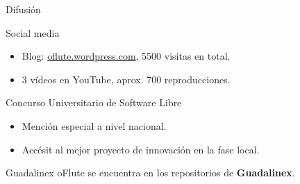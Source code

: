 \begin{frame}{Difusión}
  \begin{block}{Social media}
    \begin{itemize}
    \item Blog: \url{oflute.wordpress.com}, 5500 visitas en total.
    \item 3 vídeos en YouTube, aprox. 700 reproducciones.
    \end{itemize}    
  \end{block}

  \pause

  \begin{block}{Concurso Universitario de Software Libre}
    \begin{itemize}
    \item Mención especial a nivel nacional.
    \item Accésit al mejor proyecto de innovación en la fase local.
    \end{itemize}
  \end{block}
  
  \pause

  \begin{block}{Guadalinex}
    oFlute se encuentra  en los repositorios de \textbf{Guadalinex}.
  \end{block}
\end{frame}
